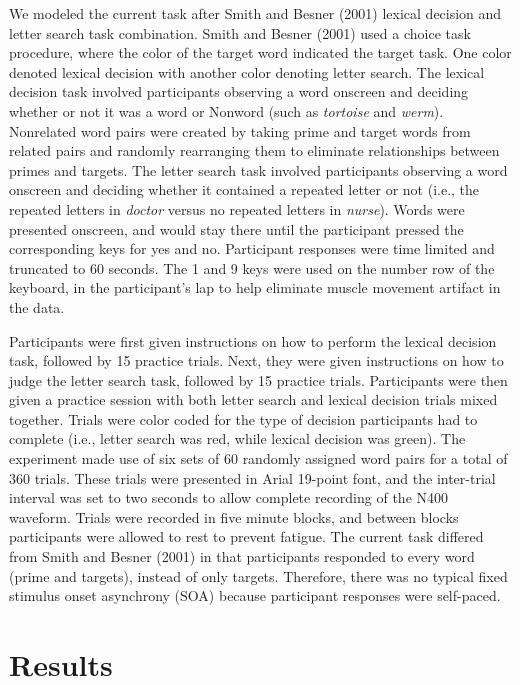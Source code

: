 \documentclass[english,man]{apa6}
\theoremstyle{definition}
\theoremstyle{definition}
\theoremstyle{definition}
\theoremstyle{remark}
\begin{document}
We modeled the current task after Smith and Besner (2001) lexical
decision and letter search task combination. Smith and Besner (2001)
used a choice task procedure, where the color of the target word
indicated the target task. One color denoted lexical decision with
another color denoting letter search. The lexical decision task involved
participants observing a word onscreen and deciding whether or not it
was a word or Nonword (such as \emph{tortoise} and \emph{werm}).
Nonrelated word pairs were created by taking prime and target words from
related pairs and randomly rearranging them to eliminate relationships
between primes and targets. The letter search task involved participants
observing a word onscreen and deciding whether it contained a repeated
letter or not (i.e., the repeated letters in \emph{doctor} versus no
repeated letters in \emph{nurse}). Words were presented onscreen, and
would stay there until the participant pressed the corresponding keys
for yes and no. Participant responses were time limited and truncated to
60 seconds. The 1 and 9 keys were used on the number row of the
keyboard, in the participant's lap to help eliminate muscle movement
artifact in the data.

Participants were first given instructions on how to perform the lexical
decision task, followed by 15 practice trials. Next, they were given
instructions on how to judge the letter search task, followed by 15
practice trials. Participants were then given a practice session with
both letter search and lexical decision trials mixed together. Trials
were color coded for the type of decision participants had to complete
(i.e., letter search was red, while lexical decision was green). The
experiment made use of six sets of 60 randomly assigned word pairs for a
total of 360 trials. These trials were presented in Arial 19-point font,
and the inter-trial interval was set to two seconds to allow complete
recording of the N400 waveform. Trials were recorded in five minute
blocks, and between blocks participants were allowed to rest to prevent
fatigue. The current task differed from Smith and Besner (2001) in that
participants responded to every word (prime and targets), instead of
only targets. Therefore, there was no typical fixed stimulus onset
asynchrony (SOA) because participant responses were self-paced.

\section{Results}\label{results}
\end{document}
